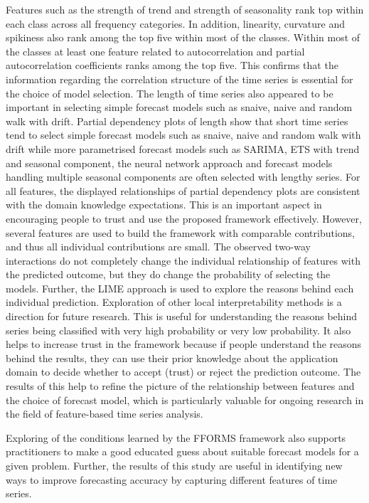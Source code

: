 \documentclass[11pt,a4paper,]{article}
\begin{document}
Features such as the strength of trend and strength of seasonality rank top within each class across all frequency categories. In addition, linearity, curvature and spikiness also rank among the top five within most of the classes. Within most of the classes at least one feature related to autocorrelation and partial autocorrelation coefficients ranks among the top five. This confirms that the information regarding the correlation structure of the time series is essential for the choice of model selection. The length of time series also appeared to be important in selecting simple forecast models such as snaive, naive and random walk with drift. Partial dependency plots of length show that short time series tend to select simple forecast models such as snaive, naive and random walk with drift while more parametrised forecast models such as SARIMA, ETS with trend and seasonal component, the neural network approach and forecast models handling multiple seasonal components are often selected with lengthy series. For all features, the displayed relationships of partial dependency plots are consistent with the domain knowledge expectations. This is an important aspect in encouraging people to trust and use the proposed framework effectively. However, several features are used to build the framework with comparable contributions, and thus all individual contributions are small. The observed two-way interactions do not completely change the individual relationship of features with the predicted outcome, but they do change the probability of selecting the models. Further, the LIME approach is used to explore the reasons behind each individual prediction. Exploration of other local interpretability methods is a direction for future research. This is useful for understanding the reasons behind series being classified with very high probability or very low probability. It also helps to increase trust in the framework because if people understand the reasons behind the results, they can use their prior knowledge about the application domain to decide whether to accept (trust) or reject the prediction outcome. The results of this help to refine the picture of the relationship between features and the choice of forecast model, which is particularly valuable for ongoing research in the field of feature-based time series analysis.

Exploring of the conditions learned by the FFORMS framework also supports practitioners to make a good educated guess about suitable forecast models for a given problem. Further, the results of this study are useful in identifying new ways to improve forecasting accuracy by capturing different features of time series.
\end{document}
